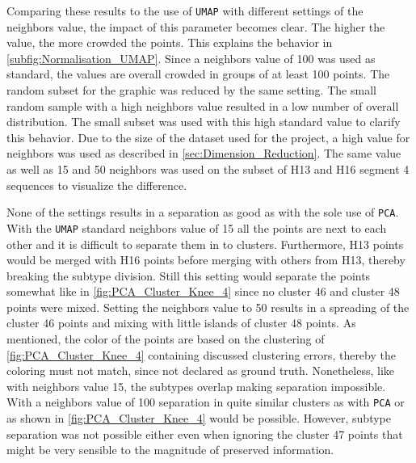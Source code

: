 \vspace{1em}

Comparing these results to the use of \texttt{UMAP} with different settings of the neighbors value, the impact of this parameter becomes clear. The higher the value, the more crowded the points. This explains the behavior in \autoref{subfig:Normalisation_UMAP}. Since a neighbors value of 100 was used as standard, the values are overall crowded in groups of at least 100 points. The random subset for the graphic was reduced by the same setting. The small random sample with a high neighbors value resulted in a low number of overall distribution. The small subset was used with this high standard value to clarify this behavior. Due to the size of the dataset used for the project, a high value for neighbors was used as described in \autoref{sec:Dimension_Reduction}. The same value as well as 15 and 50 neighbors was used on the subset of H13 and H16 segment 4 sequences to visualize the difference. 

\vspace{1em}

None of the settings results in a separation as good as with the sole use of \texttt{PCA}. With the \texttt{UMAP} standard neighbors value of 15 all the points are next to each other and it is difficult to separate them in to clusters. Furthermore, H13 points would be merged with H16 points before merging with others from H13, thereby breaking the subtype division. Still this setting would separate the points somewhat like in \autoref{fig:PCA_Cluster_Knee_4} since no cluster 46 and cluster 48 points were mixed. Setting the neighbors value to 50 results in a spreading of the cluster 46 points and mixing with little islands of cluster 48 points. As mentioned, the color of the points are based on the clustering of \autoref{fig:PCA_Cluster_Knee_4} containing discussed clustering errors, thereby the coloring must not match, since not declared as ground truth. Nonetheless, like with neighbors value 15, the subtypes overlap making separation impossible. With a neighbors value of 100 separation in quite similar clusters as with \texttt{PCA} or as shown in \autoref{fig:PCA_Cluster_Knee_4} would be possible. However, subtype separation was not possible either even when ignoring the cluster 47 points that might be very sensible to the magnitude of preserved information.

\vspace{1em}

